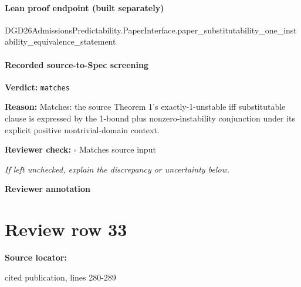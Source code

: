 \documentclass[10pt]{article}
\newcommand{\reviewerbox}{%
  \par\noindent\fbox{\parbox{0.96\linewidth}{\rule{0pt}{0.38in}}}\par
}
\newcommand{\reviewmatch}[1]{%
  \par\noindent\textbf{Reviewer check:} $\square$\; #1\par
  \noindent\emph{If left unchecked, explain the discrepancy or uncertainty below.}\par
}
\begin{document}
\paragraph{Lean proof endpoint (built separately)}\begin{ReviewVerbatim}
DGD26AdmissionsPredictability.PaperInterface.paper_substitutability_one_instability_equivalence_statement
\end{ReviewVerbatim}

\paragraph{Recorded source-to-Spec screening}
\textbf{Verdict:} \texttt{matches}
\\
{\raggedright
\textbf{Reason:} Matches:\allowbreak{} the source Theorem 1's exactly-\allowbreak{}1-\allowbreak{}unstable iff substitutable clause is expressed by the 1-\allowbreak{}bound plus nonzero-\allowbreak{}instability conjunction under its explicit positive nontrivial-\allowbreak{}domain context.\allowbreak{}
\par}
\reviewmatch{Matches source input}
\noindent\textbf{Reviewer annotation}\par
\reviewerbox
\clearpage
\hypertarget{source-claim-d2442dd19c06f77a}{}
\section*{Review row 33}
\textbf{Source locator:} {\footnotesize\raggedright cited publication, lines 280-\allowbreak{}289\par}
\end{document}
